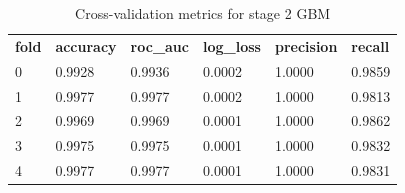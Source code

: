 \documentclass{article}
\begin{document}
\begin{table}[H]
\begin{tabular}{llllll}
\textbf{fold} & \textbf{accuracy} & \textbf{roc\_auc} & \textbf{log\_loss} & \textbf{precision} & \textbf{recall} \\
0             & 0.9928            & 0.9936            & 0.0002             & 1.0000             & 0.9859          \\
1             & 0.9977            & 0.9977            & 0.0002             & 1.0000             & 0.9813          \\
2             & 0.9969            & 0.9969            & 0.0001             & 1.0000             & 0.9862          \\
3             & 0.9975            & 0.9975            & 0.0001             & 1.0000             & 0.9832          \\
4             & 0.9977            & 0.9977            & 0.0001             & 1.0000             & 0.9831         
\end{tabular}
\caption{Cross-validation metrics for stage 2 GBM}
\end{table}
\end{document}
